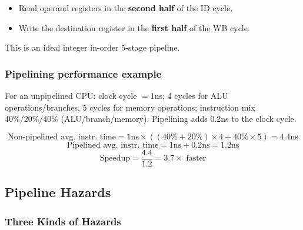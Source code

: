 \begin{center}
\begin{minipage}{\linewidth}
\end{minipage}
\end{center}

\begin{itemize}
  \item Read operand registers in the \textbf{second half} of the ID cycle.
  \item Write the destination register in the \textbf{first half} of the WB
  cycle.
\end{itemize}
This is an ideal integer in-order 5-stage pipeline.

\subsubsection{Pipelining performance example}

\begin{eg}
For an unpipelined CPU: clock cycle $=1$ns; 4 cycles for ALU
operations/branches, 5 cycles for memory operations; instruction mix
$40\%/20\%/40\%$ (ALU/branch/memory). Pipelining adds 0.2ns to the clock
cycle.

\[
  \text{Non-pipelined avg.\ instr.\ time} = 1\text{ns}\times((40\%+20\%)\times4 + 40\%\times5) = 4.4\text{ns}
\]
\[
  \text{Pipelined avg.\ instr.\ time} = 1\text{ns} + 0.2\text{ns} = 1.2\text{ns}
\]
\[
  \text{Speedup} = \frac{4.4}{1.2} = 3.7 \times \text{ faster}
\]
\end{eg}

\subsection{Pipeline Hazards}
\label{sec:hazards}

\subsubsection{Three Kinds of Hazards}
\label{sec:hazard-types}

